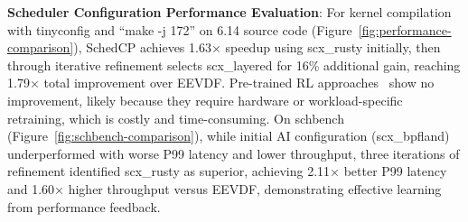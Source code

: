 \documentclass[preprint]{article}
\newcommand{\sys}{SchedCP\xspace}
\begin{document}
\textbf{Scheduler Configuration Performance Evaluation}: For kernel compilation with tinyconfig and ``make -j 172'' on 6.14 source code (Figure~\ref{fig:performance-comparison}), \sys achieves 1.63× speedup using scx\_rusty initially, then through iterative refinement selects scx\_layered for 16\% additional gain, reaching 1.79× total improvement over EEVDF. Pre-trained RL approaches~\cite{corbet2025ml} show no improvement, likely because they require hardware or workload-specific retraining, which is costly and time-consuming. On schbench~\cite{schbench2016} (Figure~\ref{fig:schbench-comparison}), while initial AI configuration (scx\_bpfland) underperformed with worse P99 latency and lower throughput, three iterations of refinement identified scx\_rusty as superior, achieving 2.11× better P99 latency and 1.60× higher throughput versus EEVDF, demonstrating effective learning from performance feedback.
\end{document}
